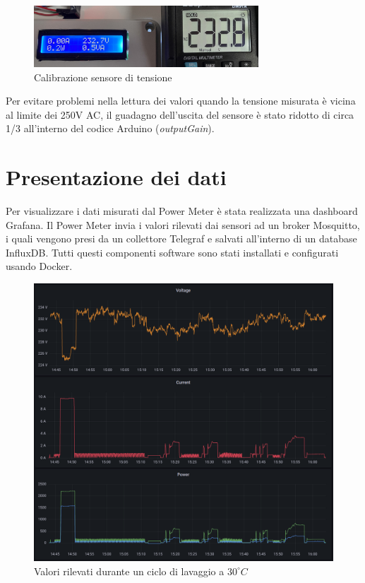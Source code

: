 \documentclass[italian,12pt,a4paper,oneside,final]{report}
\begin{document}
\begin{figure}[h]
	\centering
	\includegraphics[width=0.75\textwidth]{voltage_calibration.jpg}
	\caption{Calibrazione sensore di tensione}
	\label{fig:voltage_calibration}
\end{figure}

Per evitare problemi nella lettura dei valori quando la tensione misurata è vicina al limite dei 250V AC, il guadagno dell'uscita del sensore è stato ridotto di circa 1/3 all'interno del codice Arduino (\textit{outputGain}).

\newpage
\section{Presentazione dei dati}
Per visualizzare i dati misurati dal Power Meter è stata realizzata una dashboard Grafana.
Il Power Meter invia i valori rilevati dai sensori ad un broker Mosquitto, i quali vengono presi da un collettore Telegraf e salvati all'interno di un database InfluxDB.
Tutti questi componenti software sono stati installati e configurati usando Docker.

\begin{figure}[h]
	\centering
	\includegraphics[width=1\textwidth]{grafana_lavatrice.png}
	\caption{Valori rilevati durante un ciclo di lavaggio a $30^\circ C$}
	\label{fig:grafana_lavatrice}
\end{figure}
\end{document}
